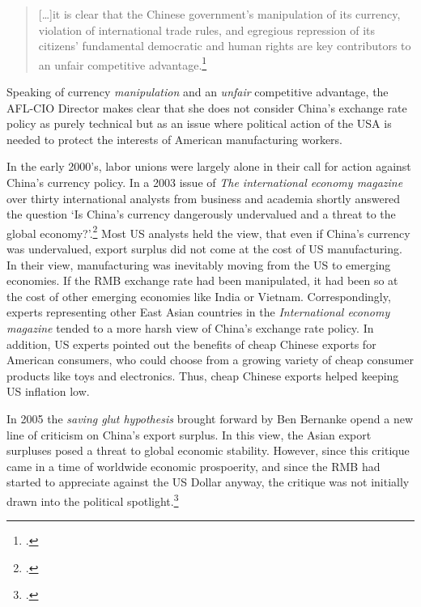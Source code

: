 \begin{quote}
[\dots]it is clear that the Chinese government’s manipulation of its 
currency, violation of international trade rules, and egregious 
repression of its citizens’ fundamental democratic and human rights are 
key contributors to an unfair competitive 
advantage.\footnote{\cite{AFL2004}.}
\end{quote}

Speaking of currency \emph{manipulation} and an \emph{unfair} 
competitive advantage, the AFL-CIO Director makes clear that she does 
not consider China's exchange rate policy as purely technical but as an 
issue where political action of the USA is needed to protect the 
interests of American manufacturing workers.

In the early 2000's, labor unions were largely alone in their call for 
action against China's currency policy. In a 2003 issue of \emph{The 
international economy magazine} over thirty international analysts from 
business and academia shortly answered the question `Is China's currency 
dangerously undervalued and a threat to the global 
economy?'.\footnote{\cite{IEM2003}.}
Most US analysts held the view, that even if China's currency was 
undervalued, export surplus did not come at the cost of US 
manufacturing. In their view, manufacturing was inevitably moving from 
the US to emerging economies. If the RMB exchange rate had been 
manipulated, it had been so at the cost of other emerging economies like 
India or Vietnam. Correspondingly, experts representing other East Asian 
countries in the \emph{International economy magazine} tended to a more 
harsh view of China's exchange rate policy. In addition, US experts 
pointed out the benefits of cheap Chinese exports for American 
consumers, who could choose from a growing variety of cheap consumer 
products like toys and electronics. Thus, cheap Chinese exports helped 
keeping US inflation low.

In 2005 the \emph{saving glut hypothesis} brought forward by Ben 
Bernanke opend a new line of criticism on China's export 
surplus. In this view, the Asian export surpluses posed a threat to global 
economic stability. However, since this critique came in a time of 
worldwide economic prospoerity, and since the RMB had started to 
appreciate against the US Dollar anyway, the critique was not initially 
drawn into the political spotlight.\footnote{\cite[p.16]{Levy2010}.}


